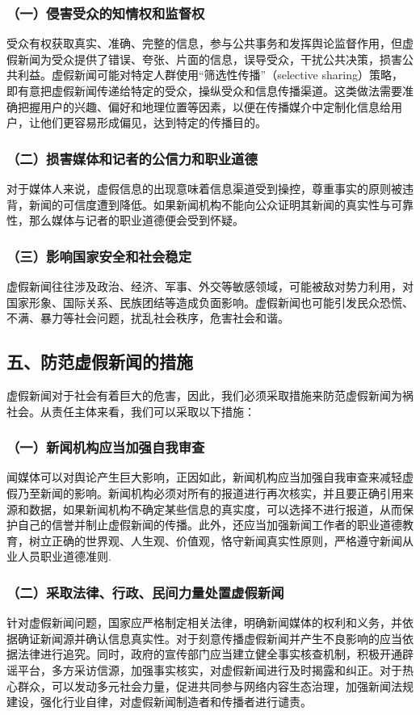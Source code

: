 ﻿\documentclass{ctexart}
\begin{document}
\subsubsection*{\quad \quad（一）侵害受众的知情权和监督权}
受众有权获取真实、准确、完整的信息，参与公共事务和发挥舆论监督作用，但虚假新闻为受众提供了错误、夸张、片面的信息，误导受众，干扰公共决策，损害公共利益。虚假新闻可能对特定人群使用“筛选性传播”（selective sharing）策略，即有意把虚假新闻传递给特定的受众，操纵受众和信息传播渠道。这类做法需要准确把握用户的兴趣、偏好和地理位置等因素，以便在传播媒介中定制化信息给用户，让他们更容易形成偏见，达到特定的传播目的。
\subsubsection*{\quad \quad（二）损害媒体和记者的公信力和职业道德}
对于媒体人来说，虚假信息的出现意味着信息渠道受到操控，尊重事实的原则被违背，新闻的可信度遭到降低。如果新闻机构不能向公众证明其新闻的真实性与可靠性，那么媒体与记者的职业道德便会受到怀疑。
\subsubsection*{\quad \quad（三）影响国家安全和社会稳定}
虚假新闻往往涉及政治、经济、军事、外交等敏感领域，可能被敌对势力利用，对国家形象、国际关系、民族团结等造成负面影响。虚假新闻也可能引发民众恐慌、不满、暴力等社会问题，扰乱社会秩序，危害社会和谐。
\subsection*{\textbf{五、防范虚假新闻的措施}}
虚假新闻对于社会有着巨大的危害，因此，我们必须采取措施来防范虚假新闻为祸社会。从责任主体来看，我们可以采取以下措施：
\subsubsection*{\quad \quad（一）新闻机构应当加强自我审查}
闻媒体可以对舆论产生巨大影响，正因如此，新闻机构应当加强自我审查来减轻虚假乃至新闻的影响。新闻机构必须对所有的报道进行再次核实，并且要正确引用来源和数据，如果新闻机构不确定某些信息的真实度，可以选择不进行报道，从而保护自己的信誉并制止虚假新闻的传播。此外，还应当加强新闻工作者的职业道德教育，树立正确的世界观、人生观、价值观，恪守新闻真实性原则，严格遵守新闻从业人员职业道德准则.
\subsubsection*{\quad \quad（二）采取法律、行政、民间力量处置虚假新闻}
针对虚假新闻问题，国家应严格制定相关法律，明确新闻媒体的权利和义务，并依据确证新闻源并确认信息真实性。对于刻意传播虚假新闻并产生不良影响的应当依据法律进行追究。同时，政府的宣传部门应当建立健全事实核查机制，积极开通辟谣平台，多方采访信源，加强事实核实，对虚假新闻进行及时揭露和纠正。对于热心群众，可以发动多元社会力量，促进共同参与网络内容生态治理，加强新闻法规建设，强化行业自律，对虚假新闻制造者和传播者进行谴责。
\end{document}

